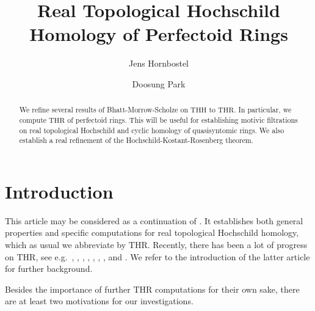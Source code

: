 \documentclass[10pt]{amsart}
\theoremstyle{definition}
\numberwithin{equation}{section}
\newcommand{\THH}{\mathrm{THH}}
\newcommand{\THR}{\mathrm{THR}}
\begin{document}
\author{Jens Hornbostel}
\address{Bergische Universit{\"a}t Wuppertal,
Fakult{\"a}t f\"ur Mathematik und Naturwissenschaften
\\
Gau{\ss}strasse 20, 42119 Wuppertal, Germany}
\author{Doosung Park}
\address{Bergische Universit{\"a}t Wuppertal,
Fakult{\"a}t f\"ur Mathematik und Naturwissenschaften
\\
Gau{\ss}strasse 20, 42119 Wuppertal, Germany}


\title{Real Topological Hochschild Homology of Perfectoid Rings}
\begin{abstract}
We refine several results of Bhatt-Morrow-Scholze on $\THH$ to $\THR$. In particular, we compute $\THR$ of perfectoid rings.
This will be useful for establishing motivic filtrations on real topological Hochschild and cyclic homology of quasisyntomic rings.
We also establish a real refinement of the Hochschild-Kostant-Rosenberg theorem.
\end{abstract}
\maketitle

\section{Introduction}
This article 
may be considered as a continuation of \cite{HP23}.
It establishes both general properties and specific computations for real topological Hochschild homology, which as usual we abbreviate by  $\THR$.
Recently, there has been a lot of progress on $\THR$, see e.g.\ 
\cite{AKGH}, 
\cite{DMP},
\cite{DMPR21}, 
\cite{DO19}, \cite{HW21}, \cite{QS22}, \cite{Par23log},
and \cite{HP23}. We refer to the introduction of the latter article for further background. 

\medskip

Besides the importance of further $\THR$ computations for their own sake, there are at least two motivations for our investigations. 
\end{document}

